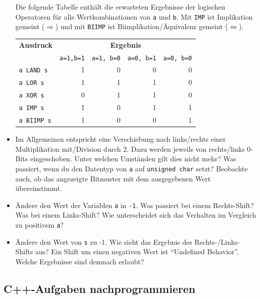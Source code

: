 \begin{itemize}
Die folgende Tabelle enthält die erwarteten Ergebnisse der logischen Operatoren für alle Wertkombinationen von \lstinline|a| und \lstinline|b|.
Mit \texttt{IMP} ist Implikation gemeint ($\Rightarrow$) und mit \texttt{BIIMP} ist Biimplikation/Äquivalenz gemeint ($\Leftrightarrow$).\\[1ex]
\begin{center}
\begin{tabular}{lrrrr}
    \toprule
    \textbf{Ausdruck} & \multicolumn{4}{c}{\textbf{Ergebnis}}\\
    & \lstinline|a=1,b=1| & \lstinline|a=1, b=0| & \lstinline|a=0, b=1| & \lstinline|a=0, b=0|\\
    \midrule
    \texttt{a LAND s}  & 1  & 0& 0& 0\\
    \texttt{a LOR s}   & 1  & 1& 1& 0\\
    \texttt{a XOR s}   & 0  & 1& 1& 0\\
    \texttt{a IMP s}   & 1  & 0& 1& 1\\
    \texttt{a BIIMP s} & 1  & 0& 0& 1\\
    \bottomrule
\end{tabular}
\end{center}
\item 
Im Allgemeinen entspricht eine Verschiebung nach links/rechts einer Multiplikation mit/Division durch 2.
Dazu werden jeweils von rechts/links 0-Bits eingeschoben.
Unter welchen Umständen gilt dies nicht mehr?
Was passiert, wenn du den Datentyp von \lstinline|a| auf \lstinline|unsigned char| setzt?
Beobachte auch, ob das angezeigte Bitmuster mit dem ausgegebenen Wert übereinstimmt.
\item 
Ändere den Wert der Variablen \lstinline|a| in \lstinline|-1|.
Was passiert bei einem Rechts-Shift?
Was bei einem Links-Shift?
Wie unterscheidet sich das Verhalten im Vergleich zu positivem \lstinline|a|?
\item 
Ändere den Wert von \lstinline|s| zu -1.
Wie sieht das Ergebnis des Rechts-/Links-Shifts aus?
Ein Shift um einen negativen Wert ist \enquote{Undefined Behavior}.
Welche Ergebnisse sind demnach erlaubt?
\end{itemize}

\subsection{C++-Aufgaben nachprogrammieren \optional}

